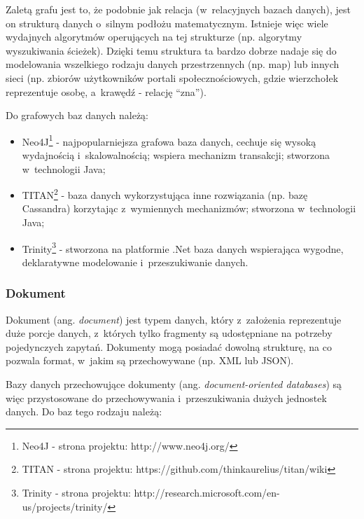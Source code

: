 Zaletą grafu jest to, że podobnie jak relacja (w~relacyjnych bazach danych), jest on strukturą danych o~silnym podłożu matematycznym.
Istnieje więc wiele wydajnych algorytmów operujących na tej strukturze (np. algorytmy wyszukiwania ścieżek).
Dzięki temu struktura ta bardzo dobrze nadaje się do modelowania wszelkiego rodzaju danych przestrzennych (np. map) lub innych sieci (np. zbiorów użytkowników portali społecznościowych, gdzie wierzchołek reprezentuje osobę, a~krawędź - relację ``zna'').

Do grafowych baz danych należą:

\begin{itemize}
 \item Neo4J\footnote{Neo4J - strona projektu: http://www.neo4j.org/} - najpopularniejsza grafowa baza danych, cechuje się wysoką wydajnością i~skalowalnością; wspiera mechanizm transakcji; stworzona w~technologii Java;
 \item TITAN\footnote{TITAN - strona projektu: https://github.com/thinkaurelius/titan/wiki} - baza danych wykorzystująca inne rozwiązania (np. bazę Cassandra) korzytając z~wymiennych mechanizmów; stworzona w~technologii Java;
 \item Trinity\footnote{Trinity - strona projektu: http://research.microsoft.com/en-us/projects/trinity/} - stworzona na platformie .Net baza danych wspierająca wygodne, deklaratywne modelowanie i~przeszukiwanie danych.
\end{itemize}

\subsubsection{Dokument}

Dokument (ang. \emph{document}) jest typem danych, który z~założenia reprezentuje duże porcje danych, z~których tylko fragmenty są udostępniane na potrzeby pojedynczych zapytań.
Dokumenty mogą posiadać dowolną strukturę, na co pozwala format, w~jakim są przechowywane (np. XML lub JSON).

Bazy danych przechowujące dokumenty (ang. \emph{document-oriented databases}) są więc przystosowane do przechowywania i~przeszukiwania dużych jednostek danych.
Do baz tego rodzaju należą:

